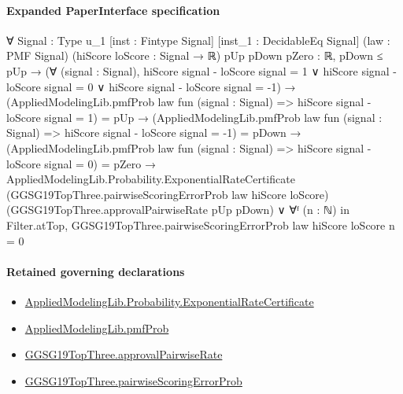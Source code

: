 \documentclass[10pt]{article}
\begin{document}
\paragraph{Expanded PaperInterface specification}
\begin{ReviewVerbatim}
∀ {Signal : Type u_1} [inst : Fintype Signal] [inst_1 : DecidableEq Signal] (law : PMF Signal)
  (hiScore loScore : Signal → ℝ) {pUp pDown pZero : ℝ},
  pDown ≤ pUp →
    (∀ (signal : Signal),
        hiScore signal - loScore signal = 1 ∨
          hiScore signal - loScore signal = 0 ∨ hiScore signal - loScore signal = -1) →
      (AppliedModelingLib.pmfProb law fun (signal : Signal) => hiScore signal - loScore signal = 1) = pUp →
        (AppliedModelingLib.pmfProb law fun (signal : Signal) => hiScore signal - loScore signal = -1) = pDown →
          (AppliedModelingLib.pmfProb law fun (signal : Signal) => hiScore signal - loScore signal = 0) = pZero →
            AppliedModelingLib.Probability.ExponentialRateCertificate
                (GGSG19TopThree.pairwiseScoringErrorProb law hiScore loScore)
                (GGSG19TopThree.approvalPairwiseRate pUp pDown) ∨
              ∀ᶠ (n : ℕ) in Filter.atTop, GGSG19TopThree.pairwiseScoringErrorProb law hiScore loScore n = 0
\end{ReviewVerbatim}

\paragraph{Retained governing declarations}
\begin{itemize}\raggedright
\item \hyperlink{governing-declaration-330a08568e50e95e}{Applied\allowbreak{}Modeling\allowbreak{}Lib.\allowbreak{}Probability.\allowbreak{}Exponential\allowbreak{}Rate\allowbreak{}Certificate}
\item \hyperlink{governing-declaration-9c38d53b9d664221}{Applied\allowbreak{}Modeling\allowbreak{}Lib.\allowbreak{}pmf\allowbreak{}Prob}
\item \hyperlink{governing-declaration-518195fba9044936}{GGSG19\allowbreak{}Top\allowbreak{}Three.\allowbreak{}approval\allowbreak{}Pairwise\allowbreak{}Rate}
\item \hyperlink{governing-declaration-4a5a5a764b383123}{GGSG19\allowbreak{}Top\allowbreak{}Three.\allowbreak{}pairwise\allowbreak{}Scoring\allowbreak{}Error\allowbreak{}Prob}
\end{itemize}
\end{document}
